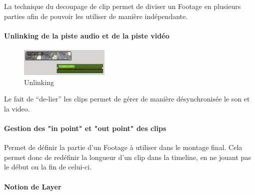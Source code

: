 La technique du decoupage de clip permet de diviser un Footage en
plusieurs parties afin de pouvoir les utiliser de manière indépendante.

\paragraph{}

\paragraph{Unlinking de la piste audio et de la piste vidéo}

\begin{figure}

  \vspace{-20pt} \begin{center}

  \includegraphics[width=0.38\textwidth]{images/unlinked}

  \end{center} \vspace{-30pt} \caption{Unlinking} \label{Yes}

  \vspace{-10pt}

\end{figure}

Le fait de ``de-lier'' les clips permet de gérer de manière
désynchronisée le son et la video.

\paragraph{Gestion des "in point" et  "out point" des clips}

  Permet de définir la partie d'un Footage à utiliser dans le montage
  final. Cela permet donc de redéfinir la longueur d'un clip dans la
  timeline, en ne jouant pas le début ou la fin de celui-ci.

\paragraph{}

\paragraph{Notion de Layer}

